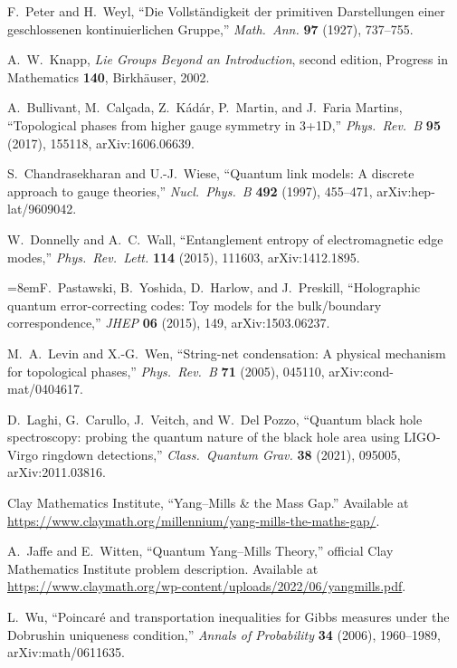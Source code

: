 F.~Peter and H.~Weyl,
``Die Vollst\"andigkeit der primitiven Darstellungen einer geschlossenen kontinuierlichen Gruppe,''
\emph{Math.\ Ann.} \textbf{97} (1927), 737--755.

A.~W.~Knapp,
\emph{Lie Groups Beyond an Introduction},
second edition, Progress in Mathematics \textbf{140},
Birkh\"auser, 2002.

A.~Bullivant, M.~Cal\c{c}ada, Z.~K\'ad\'ar, P.~Martin, and J.~Faria Martins,
``Topological phases from higher gauge symmetry in 3+1D,''
\emph{Phys.\ Rev.\ B} \textbf{95} (2017), 155118,
arXiv:1606.06639.

S.~Chandrasekharan and U.-J.~Wiese,
``Quantum link models: A discrete approach to gauge theories,''
\emph{Nucl.\ Phys.\ B} \textbf{492} (1997), 455--471,
arXiv:hep-lat/9609042.

W.~Donnelly and A.~C.~Wall,
``Entanglement entropy of electromagnetic edge modes,''
\emph{Phys.\ Rev.\ Lett.} \textbf{114} (2015), 111603,
arXiv:1412.1895.

{\emergencystretch=8em\relax F.~Pastawski, B.~Yoshida, D.~Harlow, and J.~Preskill,
``Holographic quantum error-correcting codes: Toy models for the bulk/boundary correspondence,''
\emph{JHEP} \textbf{06} (2015), 149,
arXiv:1503.06237.\par}

M.~A.~Levin and X.-G.~Wen,
``String-net condensation: A physical mechanism for topological phases,''
\emph{Phys.\ Rev.\ B} \textbf{71} (2005), 045110,
arXiv:cond-mat/0404617.

D.~Laghi, G.~Carullo, J.~Veitch, and W.~Del Pozzo,
``Quantum black hole spectroscopy: probing the quantum nature of the black hole area using LIGO-Virgo ringdown detections,''
\emph{Class.\ Quantum Grav.} \textbf{38} (2021), 095005,
arXiv:2011.03816.

Clay Mathematics Institute,
``Yang--Mills \& the Mass Gap.''
Available at \url{https://www.claymath.org/millennium/yang-mills-the-maths-gap/}.

A.~Jaffe and E.~Witten,
``Quantum Yang--Mills Theory,''
official Clay Mathematics Institute problem description.
Available at \url{https://www.claymath.org/wp-content/uploads/2022/06/yangmills.pdf}.

L.~Wu,
``Poincar\'e and transportation inequalities for Gibbs measures under the Dobrushin uniqueness condition,''
\emph{Annals of Probability} \textbf{34} (2006), 1960--1989,
arXiv:math/0611635.

